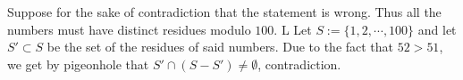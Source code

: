 Suppose for the sake of contradiction that the statement is wrong. Thus all the numbers must have distinct residues modulo $100$. L
Let $S:=\{1,2,\cdots,100\}$ and let $S'\subset S$ be the set of the residues of said numbers. Due to the fact that $52>51$, we get by pigeonhole
that $S'\cap (S-S')\ne \emptyset$, contradiction.
